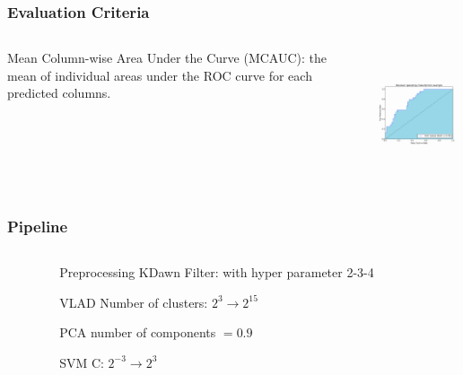 \documentclass{beamer}
\begin{document}
\begin{frame}
\frametitle{Evaluation Criteria}
\begin{columns}[T]
\begin{column}{.5\textwidth}
Mean Column-wise Area Under the Curve (MCAUC): the mean of individual areas under the ROC curve for each predicted columns.

\end{column}
\begin{column}{.5\textwidth}
\begin{center}
\includegraphics[height=1.5in]{9NpXJ.png}
\end{center}
\end{column}
\end{columns}


\end{frame}



\begin{frame}


\frametitle{Pipeline}
\begin{columns}[T]
\begin{column}{.1\textwidth}

\end{column}
\begin{column}{.8\textwidth}
\begin{block}{Preprocessing}
KDawn Filter: with hyper parameter 2-3-4 
\end{block}

\begin{block}{VLAD}
Number of clusters: $2^3\rightarrow 2^{15}$ 
\end{block}

\begin{block}{PCA}
number of components $=0.9$
\end{block}

\begin{block}{SVM}
C: $2^{-3}\rightarrow 2^{3}$ 
\end{block}
\end{column} 
\begin{column}{.1\textwidth}

\end{column}
\end{columns}
\end{frame}
\end{document}
